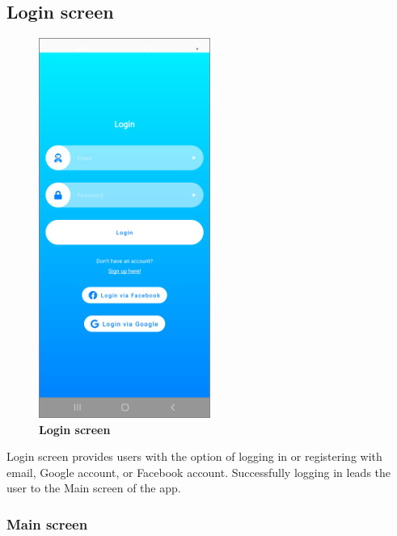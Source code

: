 \subsection{Login screen}
\begin{figure}[!htb]
\centering
\includegraphics[width=0.5\textwidth]{../Images/UI/Login.jpg}
\caption{\label{fig:dbapiuser}\textbf{Login screen}}
\end{figure} 

Login screen provides users with the option of logging in or registering with email, Google account, or Facebook account. Successfully logging in leads the user to the Main screen of the app.
\newpage

\subsubsection{Main screen}

